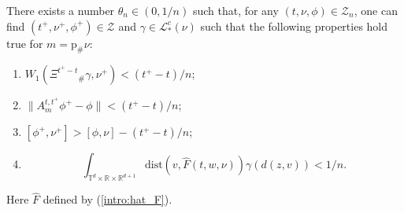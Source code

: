 \documentclass[a4paper,12pt]{article}
\newcommand{\rdp}{\mathbb{R}^{d+1}}
\newcommand{\tdr}{\mathbb{T}^{d}\times\mathbb{R}}
\begin{document}
\begin{lemma}\label{lm:step}  
	There exists a number $\theta_n\in (0,1/n)$ such that, for any $(t,\nu,\phi)\in\mathcal{Z}_n$, one can find $(t^+,\nu^+,\phi^+)\in \mathcal{Z}$ and $\gamma\in \mathcal{L}_*^c(\nu)$ such that the following properties hold true for $m=\mathrm{p}_\#\nu$:
	\begin{enumerate}
		\item $W_1(\Xi^{t^+-t}{}_\#\gamma,\nu^+)<(t^+-t)/n$;
		\item $\|A_{m}^{t,t^+}\phi^+-\phi\|<(t^+-t)/n$;
		\item $[\phi^+,\nu^+]> [\phi,\nu]-(t^+-t)/n$;
		\item $$\int_{\tdr\times\rdp}\mathrm{dist}\left(v,\widehat{F}(t,w,\nu)\right)\gamma(d(z,v))< 1/n. $$
	\end{enumerate}
	Here $\widehat{F}$ defined by (\ref{intro:hat_F}).
\end{lemma}
\end{document}
